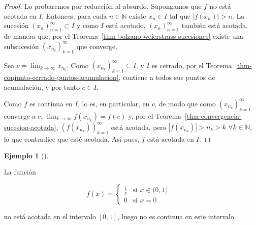 \documentclass[
  a4paper,
]{scrreport}
\theoremstyle{plain}
\theoremstyle{plain}
\theoremstyle{definition}
\theoremstyle{definition}
\newtheorem{example}{Ejemplo}[chapter]
\theoremstyle{plain}
\theoremstyle{remark}
\begin{document}
\begin{tcolorbox}[enhanced jigsaw, breakable, bottomrule=.15mm, coltitle=black, bottomtitle=1mm, opacityback=0, title=\textcolor{quarto-callout-note-color}{\faInfo}\hspace{0.5em}{Demostración}, left=2mm, toptitle=1mm, toprule=.15mm, opacitybacktitle=0.6, colframe=quarto-callout-note-color-frame, arc=.35mm, colback=white, rightrule=.15mm, titlerule=0mm, leftrule=.75mm, colbacktitle=quarto-callout-note-color!10!white]

\begin{proof}

Lo probaremos por reducción al absurdo. Supongamos que \(f\) no está
acotada en \(I\). Entonces, para cada \(n\in\mathbb{N}\) existe
\(x_n\in I\) tal que \(|f(x_n)|>n\). La sucesión
\((x_n)_{n=1}^\infty\subset I\) y como \(I\) está acotado,
\((x_n)_{n=1}^\infty\) también está acotada, de manera que, por el
Teorema~\ref{thm-bolzano-weierstrass-sucesiones} existe una subsucesión
\((x_{n_k})_{k=1}^\infty\) que converge.

Sea \(c=\lim_{k\to\infty}x_{n_k}\). Como
\((x_{n_k})_{k=1}^\infty\subset I\), y \(I\) es cerrado, por el
Teorema~\ref{thm-conjunto-cerrado-puntos-acumulacion}, contiene a todos
sus puntos de acumulación, y por tanto \(c\in I\).

Como \(f\) es continua en \(I\), lo es, en particular, en \(c\), de modo
que como \((x_{n_k})_{k=1}^\infty\) converge a \(c\),
\(\lim_{k\to\infty}f(x_{n_k}) = f(c)\) y, por el
Teorema~\ref{thm-convergencia-sucesion-acotada},
\((f(x_{n_k}))_{k=1}^\infty\) está acotada, pero \(|f(x_{n_k})|>n_k>k\)
\(\forall k\in\mathbb{N}\), lo que contradice que esté acotada. Así
pues, \(f\) está acotada en \(I\).

\end{proof}

\end{tcolorbox}

\leavevmode{}%
\begin{example}[]\label{exm-función-discontinua-no-acotada}

La función

\[
f(x)=
\begin{cases}
\frac{1}{x} & \mbox{si } x\in (0,1]\\
0 & \mbox{si } x=0
\end{cases}
\]

no está acotada en el intervalo \([0,1]\), luego no es continua en este
intervalo.

\end{example}
\end{document}

